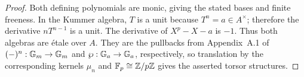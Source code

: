 \begin{proof}
Both defining polynomials are monic, giving the stated bases and finite
freeness. In the Kummer algebra, $T$ is a unit because $T^n=a\in A^\times$;
therefore the derivative $nT^{n-1}$ is a unit. The derivative of
$X^p-X-a$ is $-1$. Thus both algebras are \'etale over $A$. They are the
pullbacks from Appendix~A.1 of $(-)^n:\mathbb{G}_m\to\mathbb{G}_m$ and
$\wp:\mathbb{G}_a\to\mathbb{G}_a$, respectively, so translation by the corresponding
kernels $\mu_n$ and $\mathbb{F}_p\cong\mathbb{Z}/p\mathbb{Z}$ gives the asserted torsor structures.
\end{proof}

